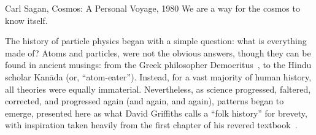\begin{dissertationintroduction}
\begin{aquote}{Carl Sagan, Cosmos: A Personal Voyage, 1980}
    We are a way for the cosmos to know itself.
\end{aquote}

The history of particle physics began with a simple question: what is everything made of? 
Atoms and particles, were not the obvious answers, though they can be found in ancient musings: from the Greek philosopher Democritus~\cite{Taylor1419554}, to the Hindu scholar Kan\=ada (or, ``atom-eater''). %
Instead, for a vast majority of human history, all theories were equally immaterial. 
Nevertheless, as science progressed, faltered, corrected, and progressed again (and again, and again), patterns began to emerge, presented here as what David Griffiths calls a ``folk history'' for brevety, with inspiration taken heavily from the first chapter of his revered textbook~\cite{Griffiths}.  


\end{dissertationintroduction}
